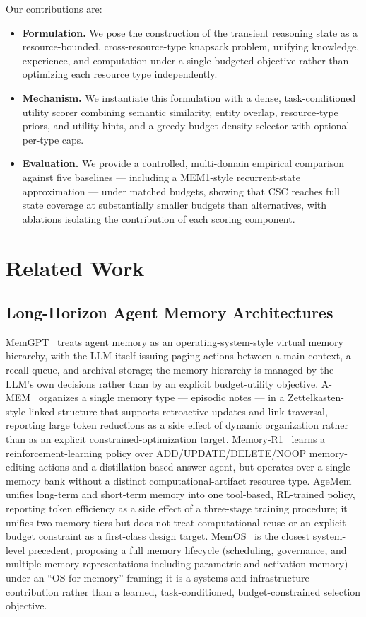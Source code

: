 \documentclass{article}
\begin{document}
Our contributions are:
\begin{itemize}
    \item \textbf{Formulation.} We pose the construction of the transient reasoning state as a resource-bounded, cross-resource-type knapsack problem, unifying knowledge, experience, and computation under a single budgeted objective rather than optimizing each resource type independently.
    \item \textbf{Mechanism.} We instantiate this formulation with a dense, task-conditioned utility scorer combining semantic similarity, entity overlap, resource-type priors, and utility hints, and a greedy budget-density selector with optional per-type caps.
    \item \textbf{Evaluation.} We provide a controlled, multi-domain empirical comparison against five baselines --- including a MEM1-style recurrent-state approximation --- under matched budgets, showing that CSC reaches full state coverage at substantially smaller budgets than alternatives, with ablations isolating the contribution of each scoring component.
\end{itemize}

\section{Related Work}
\label{sec:related}

\subsection{Long-Horizon Agent Memory Architectures}
MemGPT~\citep{packer2023memgpt} treats agent memory as an operating-system-style virtual memory hierarchy, with the LLM itself issuing paging actions between a main context, a recall queue, and archival storage; the memory hierarchy is managed by the LLM's own decisions rather than by an explicit budget-utility objective. A-MEM~\citep{xu2025amem} organizes a single memory type --- episodic notes --- in a Zettelkasten-style linked structure that supports retroactive updates and link traversal, reporting large token reductions as a side effect of dynamic organization rather than as an explicit constrained-optimization target. Memory-R1~\citep{yan2025memoryr1} learns a reinforcement-learning policy over ADD/UPDATE/DELETE/NOOP memory-editing actions and a distillation-based answer agent, but operates over a single memory bank without a distinct computational-artifact resource type. AgeMem~\citep{yu2026agemem} unifies long-term and short-term memory into one tool-based, RL-trained policy, reporting token efficiency as a side effect of a three-stage training procedure; it unifies two memory tiers but does not treat computational reuse or an explicit budget constraint as a first-class design target. MemOS~\citep{li2025memos} is the closest system-level precedent, proposing a full memory lifecycle (scheduling, governance, and multiple memory representations including parametric and activation memory) under an ``OS for memory'' framing; it is a systems and infrastructure contribution rather than a learned, task-conditioned, budget-constrained selection objective.
\end{document}
